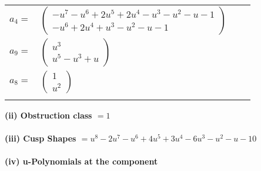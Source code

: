 \documentclass[1p]{elsarticle_modified}
\theoremstyle{definition}
\begin{document}
\begin{tabular}{m{7pt} m{180pt} m{7pt} m{180pt} }
\flushright $a_{4}=$&$\begin{pmatrix}- u^7- u^6+2 u^5+2 u^4- u^3- u^2- u-1\\- u^6+2 u^4+u^3- u^2- u-1\end{pmatrix}$ \\
\flushright $a_{9}=$&$\begin{pmatrix}u^3\\u^5- u^3+u\end{pmatrix}$ \\
\flushright $a_{8}=$&$\begin{pmatrix}1\\u^2\end{pmatrix}$\\&\end{tabular}
\flushleft \textbf{(ii) Obstruction class $= 1$}\\~\\
\flushleft \textbf{(iii) Cusp Shapes $= u^8-2 u^7- u^6+4 u^5+3 u^4-6 u^3- u^2- u-10$}\\~\\
\newpage\renewcommand{\arraystretch}{1}
\flushleft \textbf{(iv) u-Polynomials at the component}\newline \\
\end{document}
